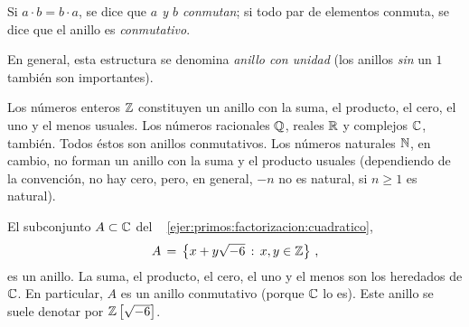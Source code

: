 \begin{defEuclidianos}\label{def:euclidianos:conmutativo}
	Si $a\cdot b=b\cdot a$, se dice que \emph{$a$ y $b$ conmutan};
	si todo par de elementos conmuta, se dice que el anillo es
	\emph{conmutativo}.
\end{defEuclidianos}

\begin{obsEuclidianos}\label{obs:euclidianos}
	En general, esta estructura se denomina \emph{anillo con unidad}
	(los anillos \emph{sin} un $1$ tambi\'en son importantes).
\end{obsEuclidianos}

\begin{ejemEuclidianos}\label{ejem:euclidianos}
	Los n\'umeros enteros $\mathbb{Z}$ constituyen un anillo con la suma,
	el producto, el cero, el uno y el menos usuales. Los n\'umeros
	racionales $\mathbb{Q}$, reales $\mathbb{R}$ y complejos $\mathbb{C}$,
	tambi\'en. Todos \'estos son anillos conmutativos.
	Los n\'umeros naturales $\mathbb{N}$, en cambio, no forman un anillo
	con la suma y el producto usuales (dependiendo de la convenci\'on,
	no hay cero, pero, en general, $-n$ no es natural, si $n\geq 1$ es
	natural).
\end{ejemEuclidianos}


\begin{ejemEuclidianos}\label{ejem:euclidianos:cuadratico}
	El subconjunto $A\subset\mathbb{C}$ del \ejername~%
	\ref{ejer:primos:factorizacion:cuadratico},
	\begin{displaymath}
		A\,=\,\big\{x+y\sqrt{-6}\,:\,x,y\in\mathbb{Z}\big\}
		\text{ ,}
	\end{displaymath}
	es un anillo. La suma, el producto, el cero, el uno y el menos son
	los heredados de $\mathbb{C}$. En particular, $A$ es un anillo
	conmutativo (porque $\mathbb{C}$ lo es). Este anillo se suele denotar
	por ${\mathbb{Z}}\left[\sqrt{-6}\right]$.
\end{ejemEuclidianos}

